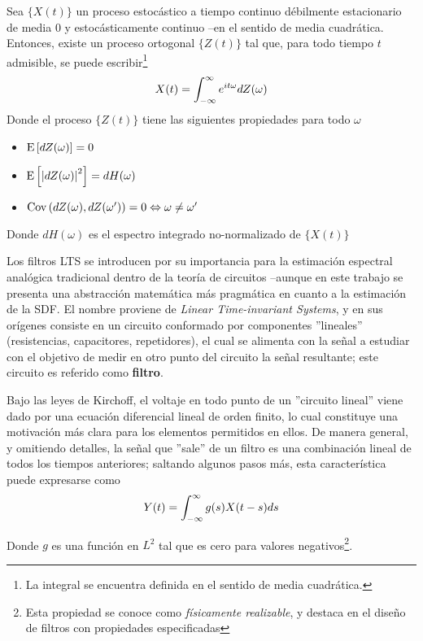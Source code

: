 \begin{thrm}
Sea $\{X(t)\}$ un proceso estoc\'astico a tiempo continuo d\'ebilmente estacionario
de media 0
y estoc\'asticamente continuo --en el 
sentido de media cuadr\'atica. Entonces, existe un proceso ortogonal $\{Z(t)\}$ tal que, para 
todo tiempo $t$ admisible, se puede escribir\footnote{La integral se encuentra definida en el
sentido de media cuadr\'atica.}
\begin{equation*}
X(t) = \int_{-\infty}^{\infty} e^{i t \omega} dZ(\omega)
\end{equation*}
Donde el proceso $\{Z(t)\}$ tiene las siguientes propiedades para todo $\omega$
\begin{itemize}
\item $\mathrm{E}\left[ dZ(\omega) \right] = 0$
\item $\mathrm{E}\left[ \left| dZ(\omega) \right|^{2} \right] = dH(\omega)$
\item $\mathrm{Cov}\left( dZ(\omega),dZ(\omega^{\prime}) \right) = 0 \Leftrightarrow \omega \neq \omega^{\prime}$
\end{itemize}
Donde $dH(\omega)$ es el espectro integrado no-normalizado de $\{X(t)\}$
\end{thrm}

Los filtros LTS se introducen por su importancia 
para la estimaci\'on espectral
anal\'ogica tradicional dentro de la teor\'ia de circuitos --aunque en este trabajo se presenta
una abstracci\'on matem\'atica m\'as pragm\'atica en cuanto a la estimaci\'on de la SDF.
El nombre proviene de \textit{Linear Time-invariant Systems}, y en sus or\'igenes consiste en
un circuito conformado por componentes ''lineales'' (resistencias, capacitores, repetidores),
el cual se alimenta con la se\~nal a estudiar con el objetivo de medir en otro punto del
circuito la se\~nal resultante; este circuito es referido como \textbf{filtro}.

Bajo las leyes de Kirchoff, el voltaje en todo punto de un ''circuito lineal'' viene dado
por una ecuaci\'on diferencial lineal de orden finito, lo cual constituye una motivaci\'on
m\'as clara para los elementos permitidos en ellos. De manera general, y omitiendo detalles,
la se\~nal que ''sale'' de un filtro es una combinaci\'on lineal de todos los tiempos anteriores;
saltando algunos pasos m\'as,
esta caracter\'istica puede expresarse como
\begin{equation}
Y(t) = \int_{-\infty}^{\infty} g(s) X(t-s) ds
\label{LTS}
\end{equation}

Donde $g$ es una funci\'on en $L^{2}$ tal que es cero para valores negativos\footnote{Esta
propiedad se conoce como \textit{f\'isicamente realizable}, y destaca en el dise\~no de 
filtros con propiedades especificadas}.

